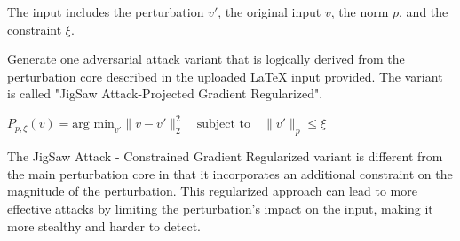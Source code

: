 The input includes the perturbation $v'$, the original input $v$, the norm $p$, and the constraint $\xi$.

Generate one adversarial attack variant that is logically derived from the perturbation core described in the uploaded LaTeX input provided.  The variant is called "JigSaw Attack-Projected Gradient Regularized".

$P_{p, \xi}(v) = \text{arg min}_{v'} \| v - v' \|_2^2 \quad \text{subject to} \quad \| v' \|_p \leq \xi$

The JigSaw Attack - Constrained Gradient Regularized variant is different from the main perturbation core in that it incorporates an additional constraint on the magnitude of the perturbation. This regularized approach can lead to more effective attacks by limiting the perturbation's impact on the input, making it more stealthy and harder to detect.